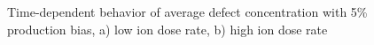\documentclass[a4paper]{article}
\begin{document}
    \begin{figure}[h!]  %
      \centering
      \qquad
      \caption{Time-dependent behavior of average defect concentration  with 5\% production bias, a) low ion dose rate, b) high ion dose rate}
      \label{figure:average_concentrations_ion_5}
    \end{figure}
\end{document}
